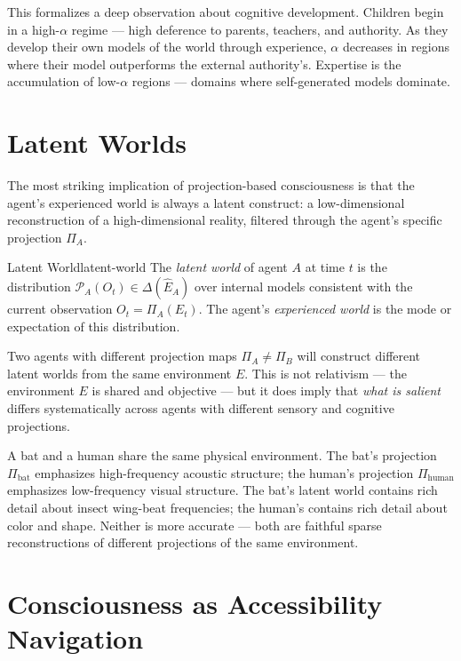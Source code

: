This formalizes a deep observation about cognitive development. Children
begin in a high-$\alpha$ regime — high deference to parents, teachers,
and authority. As they develop their own models of the world through
experience, $\alpha$ decreases in regions where their model outperforms
the external authority's. Expertise is the accumulation of low-$\alpha$
regions — domains where self-generated models dominate.

\section{Latent Worlds}

The most striking implication of projection-based consciousness is that
the agent's experienced world is always a latent construct: a low-dimensional
reconstruction of a high-dimensional reality, filtered through the agent's
specific projection $\Pi_A$.

\begin{definition}{Latent World}{latent-world}
  The \emph{latent world} of agent $A$ at time $t$ is the distribution
  $\mathcal{P}_A(O_t) \in \Delta(\hat{E}_A)$ over internal models
  consistent with the current observation $O_t = \Pi_A(E_t)$.
  The agent's \emph{experienced world} is the mode or expectation of
  this distribution.
\end{definition}

Two agents with different projection maps $\Pi_A \neq \Pi_B$ will
construct different latent worlds from the same environment $E$.
This is not relativism — the environment $E$ is shared and objective —
but it does imply that \emph{what is salient} differs systematically
across agents with different sensory and cognitive projections.

\begin{example}
  A bat and a human share the same physical environment. The bat's
  projection $\Pi_{\text{bat}}$ emphasizes high-frequency acoustic
  structure; the human's projection $\Pi_{\text{human}}$ emphasizes
  low-frequency visual structure. The bat's latent world contains
  rich detail about insect wing-beat frequencies; the human's contains
  rich detail about color and shape. Neither is more accurate — both
  are faithful sparse reconstructions of different projections of the
  same environment.
\end{example}

\section{Consciousness as Accessibility Navigation}

